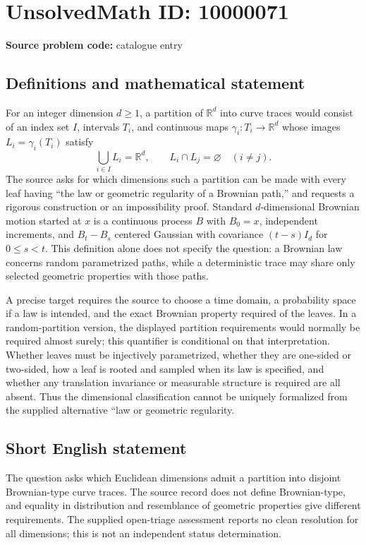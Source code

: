 \documentclass[11pt]{article}
\newcommand{\R}{\mathbb{R}}
\begin{document}
\section*{UnsolvedMath ID: 10000071}
\textbf{Source problem code:} catalogue entry
\subsection{Definitions and mathematical statement}
For an integer dimension \(d\ge1\), a partition of \(\R^d\) into curve traces would consist of an index set \(I\), intervals \(T_i\), and continuous maps \(\gamma_i:T_i\to\R^d\) whose images \(L_i=\gamma_i(T_i)\) satisfy
\[
 \bigcup_{i\in I}L_i=\R^d,\qquad L_i\cap L_j=\varnothing\quad(i\ne j).
\]
The source asks for which dimensions such a partition can be made with every leaf having ``the law or geometric regularity of a Brownian path,'' and requests a rigorous construction or an impossibility proof. Standard \(d\)-dimensional Brownian motion started at \(x\) is a continuous process \(B\) with \(B_0=x\), independent increments, and \(B_t-B_s\) centered Gaussian with covariance \((t-s)I_d\) for \(0\le s<t\). This definition alone does not specify the question: a Brownian law concerns random parametrized paths, while a deterministic trace may share only selected geometric properties with those paths.

A precise target requires the source to choose a time domain, a probability space if a law is intended, and the exact Brownian property required of the leaves. In a random-partition version, the displayed partition requirements would normally be required almost surely; this quantifier is conditional on that interpretation. Whether leaves must be injectively parametrized, whether they are one-sided or two-sided, how a leaf is rooted and sampled when its law is specified, and whether any translation invariance or measurable structure is required are all absent. Thus the dimensional classification cannot be uniquely formalized from the supplied alternative ``law or geometric regularity.
\subsection{Short English statement}
The question asks which Euclidean dimensions admit a partition into disjoint Brownian-type curve traces. The source record does not define Brownian-type, and equality in distribution and resemblance of geometric properties give different requirements. The supplied open-triage assessment reports no clean resolution for all dimensions; this is not an independent status determination.
\end{document}
